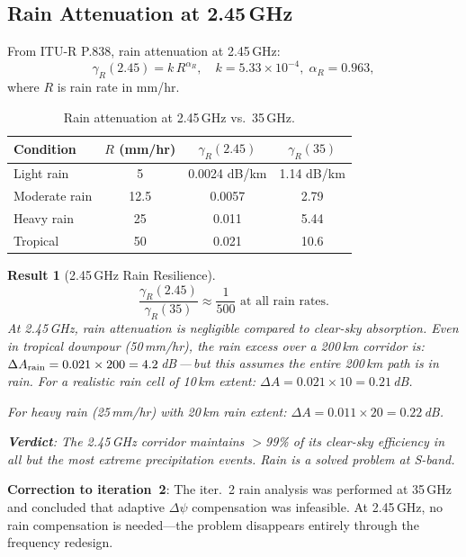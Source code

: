 \documentclass[aps,prd,twocolumn,superscriptaddress]{revtex4-2}
\newtheorem{result}{Result}
\begin{document}
\subsection{Rain Attenuation at 2.45\,GHz}

From ITU-R P.838, rain attenuation at 2.45\,GHz:
\begin{equation}
\gamma_R(2.45) = k\,R^{\alpha_R},
\quad k = 5.33\times10^{-4},\;\alpha_R = 0.963,
\end{equation}
where $R$ is rain rate in mm/hr.

\begin{table}[h]
\caption{Rain attenuation at 2.45\,GHz vs.\ 35\,GHz.}
\label{tab:rain-245}
\begin{ruledtabular}
\begin{tabular}{lccc}
Condition & $R$ (mm/hr) & $\gamma_R(2.45)$ & $\gamma_R(35)$ \\
\hline
Light rain & 5 & 0.0024 dB/km & 1.14 dB/km \\
Moderate rain & 12.5 & 0.0057 & 2.79 \\
Heavy rain & 25 & 0.011 & 5.44 \\
Tropical & 50 & 0.021 & 10.6 \\
\end{tabular}
\end{ruledtabular}
\end{table}

\begin{result}[2.45\,GHz Rain Resilience]
\begin{equation}
\boxed{
\frac{\gamma_R(2.45)}{\gamma_R(35)} \approx
\frac{1}{500}\text{ at all rain rates.}
}
\end{equation}
At 2.45\,GHz, rain attenuation is negligible compared to clear-sky
absorption. Even in tropical downpour (50\,mm/hr), the rain excess
over a 200\,km corridor is:
$\Delta A_{\rm rain} = 0.021\times200 = 4.2$\,dB\,---\,but this
assumes the entire 200\,km path is in rain. For a realistic rain
cell of 10\,km extent: $\Delta A = 0.021\times10 = 0.21$\,dB.

For heavy rain (25\,mm/hr) with 20\,km rain extent:
$\Delta A = 0.011\times20 = 0.22$\,dB.

\textbf{Verdict}: The 2.45\,GHz corridor maintains $>$99\% of its
clear-sky efficiency in all but the most extreme precipitation
events. Rain is a solved problem at S-band.
\end{result}

\textbf{Correction to iteration~2}: The iter.~2 rain analysis was
performed at 35\,GHz and concluded that adaptive $\Delta\psi$
compensation was infeasible. At 2.45\,GHz, no rain compensation
is needed---the problem disappears entirely through the frequency
redesign.
\end{document}
